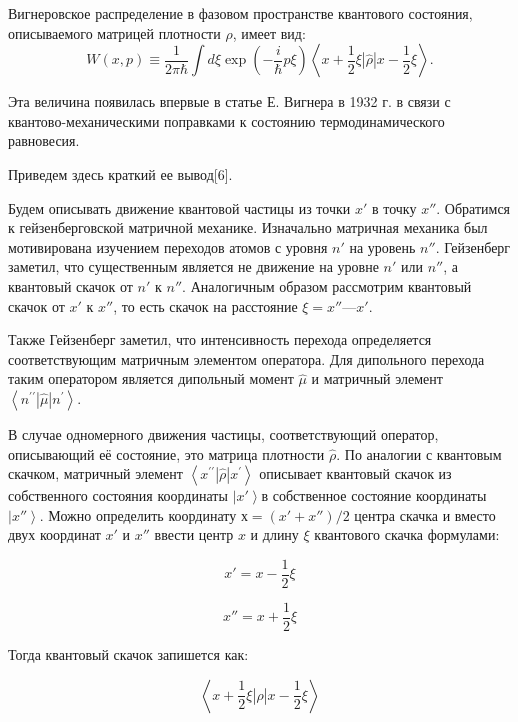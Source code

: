 \documentclass[a4paper,14pt]{article}
\begin{document}
Вигнеровское распределение в фазовом пространстве квантового состояния, описываемого матрицей плотности $\widehat{\rho}$, имеет вид:
\begin{equation}
W(x, p) \equiv \frac{1}{2 \pi \hbar} \int d \xi \exp \left(-\frac{i}{\hbar} p \xi\right)\left\langle x+\frac{1}{2} \xi|\widehat{\rho}| x-\frac{1}{2} \xi\right\rangle.
\end{equation}

Эта величина появилась впервые в статье Е. Вигнера в 1932 г. в связи с квантово-механическими поправками к состоянию термодинамического равновесия.

Приведем здесь краткий ее вывод[6].

Будем описывать движение квантовой частицы из точки $x'$ в точку $x''$. Обратимся к гейзенберговской матричной механике. Изначально матричная механика был мотивирована изучением переходов атомов с уровня $n'$ на уровень $n''$. Гейзенберг заметил, что существенным является не движение на уровне $n'$ или $n''$, а квантовый скачок от $n'$ к $n''$. Аналогичным образом рассмотрим квантовый скачок от $x'$ к $x''$, то есть скачок на расстояние $\xi = x'' — x'$. 

Также Гейзенберг заметил, что интенсивность перехода определяется соответствующим матричным элементом оператора. Для дипольного перехода таким оператором является дипольный момент $\widehat{\mu}$ и матричный элемент $\left\langle n^{\prime \prime}|\widehat{\mu}| n^{\prime}\right\rangle$. 

В случае одномерного движения частицы, соответствующий  оператор, описывающий её состояние, это матрица плотности $\widehat{\rho}$. По аналогии с квантовым скачком, матричный элемент $\left\langle x^{\prime \prime}|\widehat{\rho}| x^{\prime}\right\rangle$ описывает квантовый скачок из собственного состояния координаты $ \left|x'\right\rangle $в собственное состояние координаты $\left|x''\right\rangle$. Можно определить координату $х = (x' + x'')/2$ центра скачка и вместо двух координат $x'$ и $x''$ ввести центр $x$ и длину $\xi$ квантового скачка формулами:

\begin{equation}
x'=x-\frac{1}{2} \xi
\end{equation}

\begin{equation}
x''=x+\frac{1}{2} \xi
\end{equation}

Тогда квантовый скачок запишется как:

\begin{equation}
\left\langle x+\frac{1}{2} \xi|\widehat{\rho}| x-\frac{1}{2} \xi\right\rangle
\end{equation}
\end{document}
